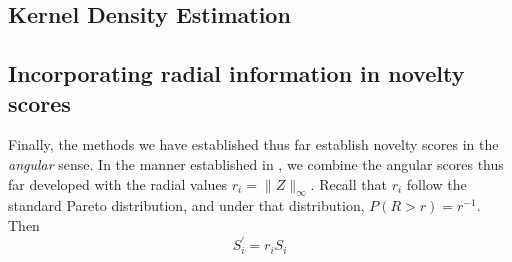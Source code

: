 \subsection{Kernel Density Estimation}







\subsection{Incorporating radial information in novelty scores}
Finally, the methods we have established thus far establish novelty scores in 
  the \emph{angular} sense.  In the manner established in \cite{goix2017}, we 
  combine the angular scores thus far developed with the radial values 
  $r_i = \lVert Z \rVert_{\infty}$.  Recall that $r_i$ follow the standard 
  Pareto distribution, and under that distribution, $P(R > r) = r^{-1}$.  Then
  \[
    S_i^{\prime} = r_iS_i
  \]



%     





















